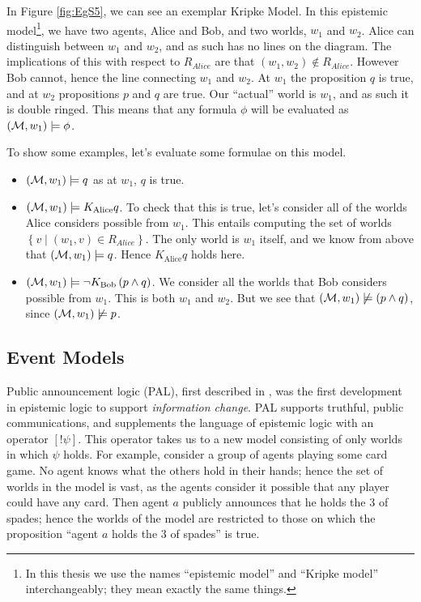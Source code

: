 \documentclass[10pt, a4paper]{report}
\begin{document}
In Figure \ref{fig:EgS5}, we can see an exemplar Kripke Model. In this epistemic
model\footnote{In this thesis we use the names ``epistemic model'' and ``Kripke
  model'' interchangeably; they mean exactly the same things.}, we have two
agents, Alice and Bob, and two worlds, $w_1$ and $w_2$. Alice can distinguish
between $w_1$ and $w_2$, and as such has no lines on the diagram. The
implications of this with respect to $R_{Alice}$ are that $(w_1, w_2) \not \in
R_{Alice}$. However Bob cannot, hence the line connecting $w_1$ and $w_2$. At
$w_1$ the proposition $q$ is true, and at $w_2$ propositions $p$ and $q$ are
true. Our ``actual'' world is $w_1$, and as such it is double ringed. This means
that any formula $\phi$ will be evaluated as $(\mathcal{M}, w_1) \models \phi$.

To show some examples, let's evaluate some formulae on this model.

\begin{itemize}
\item $(\mathcal{M}, w_1) \models q$ as at $w_1$, $q$ is true.
\item $(\mathcal{M}, w_1) \models K_{\text{Alice}} q$. To check that this is true,
  let's consider all of the worlds Alice considers possible from $w_1$. This
  entails computing the set of worlds $\left\{ v \mid (w_1, v) \in R_{Alice}
  \right\}$. The only world is $w_1$ itself, and we know from above that
  $(\mathcal{M}, w_1) \models q$. Hence $K_{\text{Alice}} q$ holds here.
\item $(\mathcal{M}, w_1) \models \neg K_{\text{Bob}} \left( p \land q \right)$. We
  consider all the worlds that Bob considers possible from $w_1$. This is both
  $w_1$ and $w_2$. But we see that $(\mathcal{M}, w_1) \not \models (p \land q)$,
  since $(\mathcal{M}, w_1) \not \models p$.
\end{itemize}

\subsection{Event Models}
\label{sec:Event Models}

Public announcement logic (PAL), first described in \cite{PAL}, was the first
development in epistemic logic to support \emph{information change}. PAL
supports truthful, public communications, and supplements the language of
epistemic logic with an operator $[!\psi]$. This operator takes us to a new
model consisting of only worlds in which $\psi$ holds. For example, consider a
group of agents playing some card game. No agent knows what the others hold in
their hands; hence the set of worlds in the model is vast, as the agents
consider it possible that any player could have any card. Then agent $a$
publicly announces that he holds the 3 of spades; hence the worlds of the model
are restricted to those on which the proposition ``agent $a$ holds the 3 of
spades'' is true.
\end{document}
